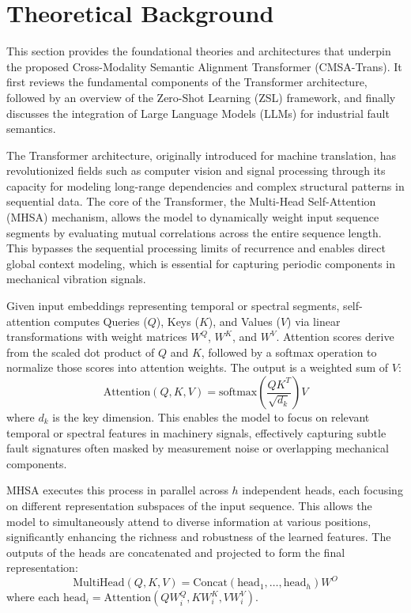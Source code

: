 \section{Theoretical Background}
This section provides the foundational theories and architectures that underpin the proposed Cross-Modality Semantic Alignment Transformer (CMSA-Trans). It first reviews the fundamental components of the Transformer architecture, followed by an overview of the Zero-Shot Learning (ZSL) framework, and finally discusses the integration of Large Language Models (LLMs) for industrial fault semantics.

The Transformer architecture, originally introduced for machine translation, has revolutionized fields such as computer vision and signal processing through its capacity for modeling long-range dependencies and complex structural patterns in sequential data. The core of the Transformer, the Multi-Head Self-Attention (MHSA) mechanism, allows the model to dynamically weight input sequence segments by evaluating mutual correlations across the entire sequence length. This bypasses the sequential processing limits of recurrence and enables direct global context modeling, which is essential for capturing periodic components in mechanical vibration signals.

Given input embeddings representing temporal or spectral segments, self-attention computes Queries ($Q$), Keys ($K$), and Values ($V$) via linear transformations with weight matrices $W^Q$, $W^K$, and $W^V$. Attention scores derive from the scaled dot product of $Q$ and $K$, followed by a softmax operation to normalize those scores into attention weights. The output is a weighted sum of $V$:
\begin{equation}
\text{Attention}(Q, K, V) = \text{softmax}\left(\frac{QK^T}{\sqrt{d_k}}\right)V
\end{equation}
where $d_k$ is the key dimension. This enables the model to focus on relevant temporal or spectral features in machinery signals, effectively capturing subtle fault signatures often masked by measurement noise or overlapping mechanical components.

MHSA executes this process in parallel across $h$ independent heads, each focusing on different representation subspaces of the input sequence. This allows the model to simultaneously attend to diverse information at various positions, significantly enhancing the richness and robustness of the learned features. The outputs of the heads are concatenated and projected to form the final representation:
\begin{equation}
\text{MultiHead}(Q, K, V) = \text{Concat}(\text{head}_1, \dots, \text{head}_h)W^O
\end{equation}
where each $\text{head}_i = \text{Attention}(QW_i^Q, KW_i^K, VW_i^V)$.

